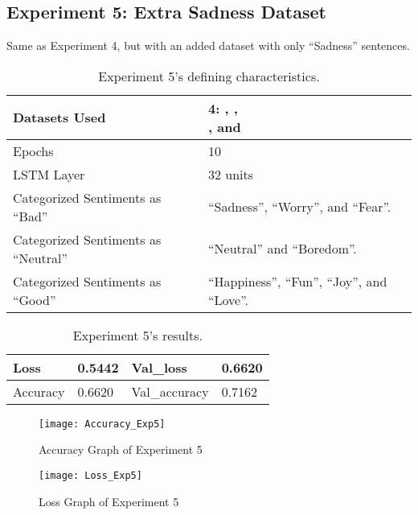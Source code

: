 \subsection{Experiment 5: Extra Sadness Dataset}
\label{exp5}
Same as Experiment 4, but with an added dataset with only ``Sadness'' sentences.
\begin{table}[!h]
	\caption{Experiment 5's defining characteristics.}
	\vspace{0.5cm}
	\centering
	\begin{tabular}[t]{|l|l|}
	\hline
		Datasets Used & \makecell{4: \citet{d1}, \citet{d2},\\ \citet{d3}, and \citet{d4}}
	\\ \hline
		Epochs & 10
	\\ \hline
		LSTM Layer & 32 units
	\\ \hline
		Categorized Sentiments as ``Bad'' & ``Sadness'', ``Worry'', and ``Fear''.
	\\ \hline	
		 Categorized Sentiments as ``Neutral'' & ``Neutral'' and ``Boredom''.
	\\ \hline	
		Categorized Sentiments as ``Good'' & ``Happiness'', ``Fun'', ``Joy'', and ``Love''.
	\\ \hline
	\end{tabular}
\end{table}

\begin{table}[!b]
	\caption{Experiment 5's results.}
	\vspace{0.5cm}
	\centering
	\begin{tabular}[t]{|l|l|l|l|}
	\hline
		Loss & 0.5442 & Val\_loss & 0.6620
	\\ \hline
		Accuracy & 0.6620 & Val\_accuracy & 0.7162
	\\ \hline
	\end{tabular}
\end{table}


\begin{figure}[!h]
	\centering
	\texttt{[image: Accuracy\_Exp5]}
	\caption{Accuracy Graph of Experiment 5}
	\label{fig:accuracy_exp5}
	\texttt{[image: Loss\_Exp5]}
	\caption{Loss Graph of Experiment 5}
	\label{fig:loss_exp5}
\end{figure}
\pagebreak

